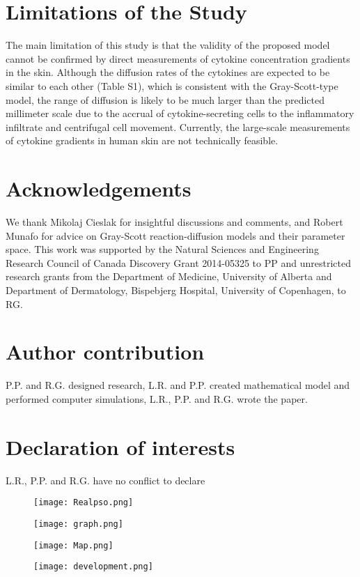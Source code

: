 \section{Limitations of the Study}
The main limitation of this study is that the validity of the proposed model cannot be confirmed by direct measurements of cytokine concentration gradients in the skin. Although the diffusion rates of the cytokines are expected to be similar to each other (Table S1), which is consistent with the Gray-Scott-type model, the range of diffusion is likely to be much larger than the predicted millimeter scale due to the accrual of cytokine-secreting cells to the inflammatory infiltrate and centrifugal cell movement. Currently, the large-scale measurements of cytokine gradients in human skin are not technically feasible. 

\section{Acknowledgements}
We thank Mikolaj Cieslak for insightful discussions and comments, and Robert Munafo for advice on Gray-Scott reaction-diffusion models and their parameter space. This work was supported by the Natural Sciences and Engineering Research Council of Canada Discovery Grant 2014-05325 to PP and unrestricted research grants from the Department of Medicine, University of Alberta and Department of Dermatology, Bispebjerg Hospital, University of Copenhagen, to RG.

\section{Author contribution}
P.P. and R.G. designed research, L.R. and P.P. created mathematical model and performed computer simulations, L.R., P.P. and R.G. wrote the paper. 

\section{Declaration of interests}
L.R., P.P. and R.G. have no conflict to declare

\begin{figure}[h]
	\centering
	\texttt{[image: Realpso.png]}
	\label{fig:pso1}
\end{figure}
		
\begin{figure}[h]
	\centering
	\texttt{[image: graph.png]}
	\label{fig:pso2}
\end{figure}
	
\begin{figure}[h]
	\centering
	\texttt{[image: Map.png]}
	\label{fig:pso3}
\end{figure}

\begin{figure}[h]
	\centering
	\texttt{[image: development.png]}
	\label{fig:pso4}
\end{figure}